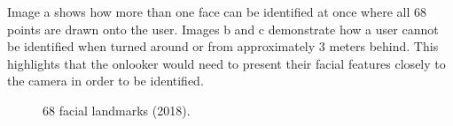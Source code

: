 \documentclass[12pt]{article}
\theoremstyle{plain}
\theoremstyle{definition}
\begin{document}
Image a shows how more than one face can be identified at once where all 68 points are drawn onto the user. Images b and c demonstrate how a user cannot be identified when turned around or from approximately 3 meters behind. This highlights that the onlooker would need to present their facial features closely to the camera in order to be identified.


\begin{figure}[ht]
\centering
{}

\caption{68 facial landmarks (2018).}
\label{fig:figure2}
\end{figure}
\end{document}

